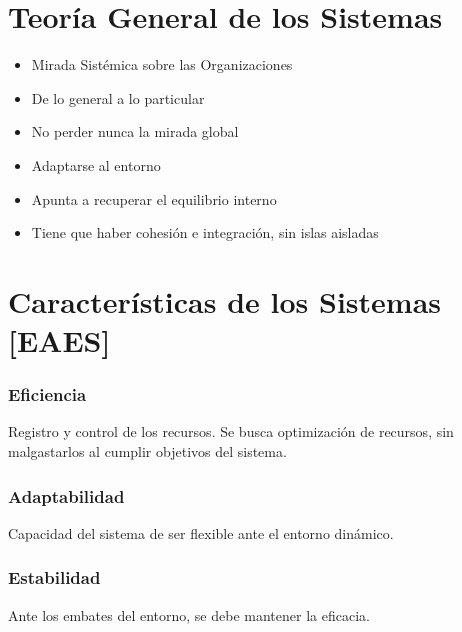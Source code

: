 \twocolumn 

\hypertarget{teoruxeda-general-de-los-sistemas}{%
\section{Teoría General de los Sistemas}\label{teoruxeda-general-de-los-sistemas}}

\begin{itemize}
\item   Mirada Sistémica sobre las Organizaciones
\item   De lo general a lo particular
\item   No perder nunca la mirada global
\item   Adaptarse al entorno
\item   Apunta a recuperar el equilibrio interno
\item   Tiene que haber cohesión e integración, sin islas aisladas
\end{itemize}

\hypertarget{caracteruxedsticas-de-los-sistemas-eaes}{%
\section{Características de los Sistemas
{[}EAES{]}}\label{caracteruxedsticas-de-los-sistemas-eaes}}

\hypertarget{eficiencia}{%
\subsubsection{Eficiencia}\label{eficiencia}}
Registro y control de los recursos. Se busca optimización de recursos, sin malgastarlos al cumplir objetivos del sistema.

\hypertarget{adaptabilidad}{%
\subsubsection{Adaptabilidad}\label{adaptabilidad}}
Capacidad del sistema de ser flexible ante el  entorno dinámico.

\hypertarget{estabilidad}{%
\subsubsection{Estabilidad}\label{estabilidad}}
Ante los embates del entorno, se debe mantener la eficacia.

